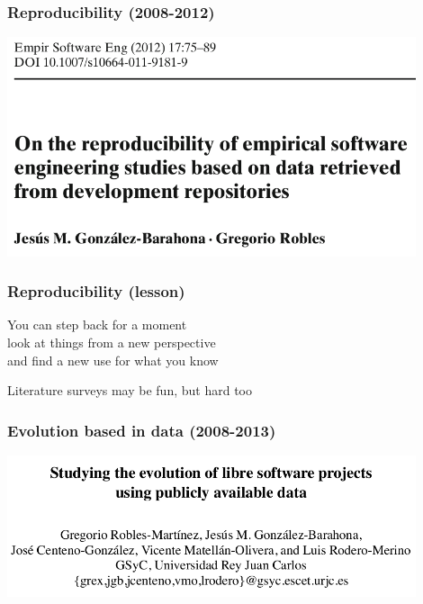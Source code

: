 \documentclass[17pt,aspectratio=169,hyperref=pdfusetitle]{beamer}
\begin{document}
\begin{frame}[fragile]
  \frametitle{Reproducibility (2008-2012)}

  \begin{center}
  \includegraphics[width=12cm]{figs/reproducibility}
  \end{center}  
  
\end{frame}

\begin{frame}[fragile]
  \frametitle{Reproducibility (lesson)}

  You can step back for a moment \\
  look at things from a new perspective \\
  and find a new use for what you know \\
  
  \begin{center}
    Literature surveys may be fun, but hard too
  \end{center}  
  
\end{frame}

\begin{frame}[fragile]
  \frametitle{Evolution based in data (2008-2013)}

  \begin{center}
  \includegraphics[width=12cm]{figs/evolution-data}
  \end{center}  
  
\end{frame}
\end{document}
